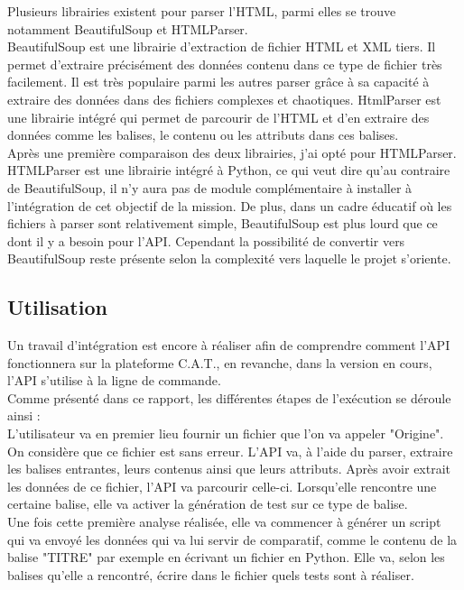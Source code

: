 Plusieurs librairies existent pour parser l'HTML, parmi elles se trouve notamment BeautifulSoup et HTMLParser.\\

BeautifulSoup est une librairie d'extraction de fichier HTML et XML tiers. Il permet d'extraire précisément des données contenu dans ce type de fichier très facilement. Il est très populaire parmi les autres parser grâce à sa capacité à extraire des données dans des fichiers complexes et chaotiques. HtmlParser est une librairie intégré qui permet de parcourir de l'HTML et d'en extraire des données comme les balises, le contenu ou les attributs dans ces balises.\\

Après une première comparaison des deux librairies, j'ai opté pour HTMLParser. HTMLParser est une librairie intégré à Python, ce qui veut dire qu'au contraire de BeautifulSoup, il n'y aura pas de module complémentaire à installer à l'intégration de cet objectif de la mission. De plus, dans un cadre éducatif où les fichiers à parser sont relativement simple, BeautifulSoup est plus lourd que ce dont il y a besoin pour l'API. Cependant la possibilité de convertir vers BeautifulSoup reste présente selon la complexité vers laquelle le projet s'oriente.\\

\subsection{Utilisation}

Un travail d'intégration est encore à réaliser afin de comprendre comment l'API fonctionnera sur la plateforme C.A.T., en revanche, dans la version en cours, l'API s'utilise à la ligne de commande.\\

Comme présenté dans ce rapport, les différentes étapes de l'exécution se déroule ainsi :\\

L'utilisateur va en premier lieu fournir un fichier que l'on va appeler "Origine". On considère que ce fichier est sans erreur. L'API va, à l'aide du parser, extraire les balises entrantes, leurs contenus ainsi que leurs attributs. Après avoir extrait les données de ce fichier, l'API va parcourir celle-ci. Lorsqu'elle rencontre une certaine balise, elle va activer la génération de test sur ce type de balise.\\

Une fois cette première analyse réalisée, elle va commencer à générer un script qui va envoyé les données qui va lui servir de comparatif, comme le contenu de la balise "TITRE" par exemple en écrivant un fichier en Python. Elle va, selon les balises qu'elle a rencontré, écrire dans le fichier quels tests sont à réaliser.\\

